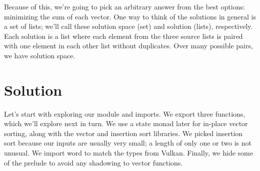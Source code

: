 \documentclass{article}
\def\resethooks{%
  \global\let\SaveRestoreHook\empty
  \global\let\ColumnHook\empty}
\newcommand{\hsindent}[1]{\quad}%
\let\hspre\empty
\let\hspost\empty
\begin{document}
\resethooks

Because of this, we're going to pick an arbitrary answer from the best options: minimizing the sum of each vector.
One way to think of the solutions in general is a set of lists; we'll call these solution space (set) and solution (lists), respectively.
Each solution is a list where each element from the three source lists is paired with one element in each other list without duplicates.
Over many possible pairs, we have solution space.

\section{Solution}

Let's start with exploring our module and imports.
We export three functions, which we'll explore next in turn.
We use a state monad later for in-place vector sorting, along with the vector and insertion sort libraries.
We picked insertion sort because our inputs are usually very small; a length of only one or two is not unusual.
We import word to match the types from Vulkan.
Finally, we hide some of the prelude to avoid any shadowing to vector functions.
\end{document}
